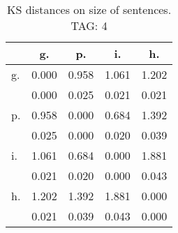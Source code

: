 \begin{table}[h!]
\begin{center}
\begin{tabular}{| l | c | c | c | c |}\hline
 & g. & p. & i. & h. \\\hline
g. & 0.000  & 0.958  & 1.061  & 1.202 \\\hline
 & 0.000  & 0.025  & 0.021  & 0.021 \\\hline
p. & 0.958  & 0.000  & 0.684  & 1.392 \\\hline
 & 0.025  & 0.000  & 0.020  & 0.039 \\\hline
i. & 1.061  & 0.684  & 0.000  & 1.881 \\\hline
 & 0.021  & 0.020  & 0.000  & 0.043 \\\hline
h. & 1.202  & 1.392  & 1.881  & 0.000 \\\hline
 & 0.021  & 0.039  & 0.043  & 0.000 \\\hline
\end{tabular}
\caption{KS distances on size of sentences. TAG: 4}
\end{center}
\end{table}